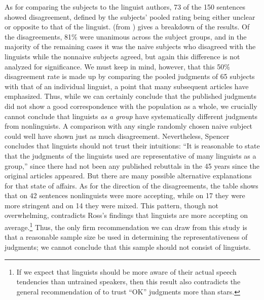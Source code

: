 As for comparing the subjects to the linguist authors, 73 of the 150 sentences showed disagreement, defined by the subjects' pooled rating being either unclear or opposite to that of the linguist.  (from \citet{Spencer1973}) gives a breakdown of the results. Of the disagreements, 81\% were unanimous across the subject groups, and in the majority of the remaining cases it was the naive subjects who disagreed with the linguists while the nonnaive subjects agreed, but again this difference is not analyzed for significance. We must keep in mind, however, that this 50\% disagreement rate is made up by comparing the pooled judgments of 65 subjects with that of an individual linguist, a point that many subsequent articles have emphasized. Thus, while we can certainly conclude that the published judgments  did not show a good correspondence with the population as a whole, we crucially cannot conclude that linguists \textit{as a group} have systematically different judgments from nonlinguists. A comparison with any single randomly chosen naive subject could well have shown just as much disagreement. Nevertheless, Spencer concludes that linguists should not trust their intuitions: ``It is reasonable to state that the judgments  of the linguists used are representative  of many linguists as a group,'' since there had not been any published rebuttals in the 4\textendash{}5 years since the original articles appeared. But there are many possible alternative explanations for that state of affairs. As for the direction of the disagreements, the table shows that on 42 sentences nonlinguists were more accepting, while on 17 they were more stringent and on 14 they were mixed. This pattern, though not overwhelming, contradicts Ross's findings that linguists are more accepting on average.\footnote{If we expect that linguists should be more aware of their actual speech tendencies than untrained speakers, then this result also contradicts the general recommendation  of \citet{HindleEtAl1975} to trust ``OK'' judgments more than stars.}
 Thus, the only firm recommendation we can draw from this study is that a reasonable sample size be used in determining the representativeness of judgments; we cannot conclude that this sample should not consist of linguists.



